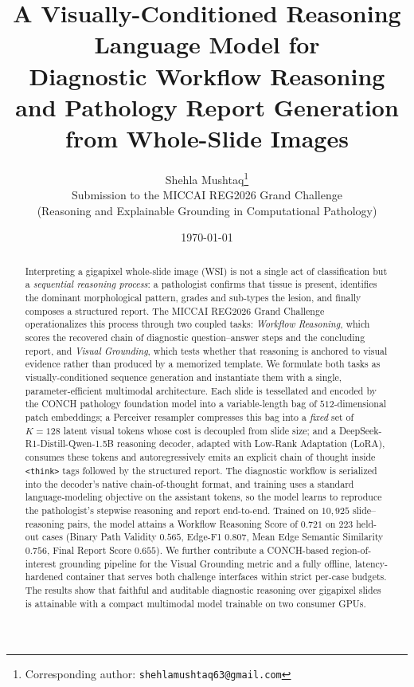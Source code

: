 \documentclass[11pt]{article}
\title{\textbf{A Visually-Conditioned Reasoning Language Model for\\
Diagnostic Workflow Reasoning and Pathology Report Generation\\
from Whole-Slide Images}}
\author{
Shehla Mushtaq\thanks{Corresponding author: \texttt{shehlamushtaq63@gmail.com}}\\
\small Submission to the MICCAI REG2026 Grand Challenge\\
\small (Reasoning and Explainable Grounding in Computational Pathology)
}
\date{\today}
\newcommand{\code}[1]{\texttt{\small #1}}
\begin{document}
\maketitle

\begin{abstract}
\noindent
Interpreting a gigapixel whole-slide image (WSI) is not a single act of
classification but a \emph{sequential reasoning process}: a pathologist confirms
that tissue is present, identifies the dominant morphological pattern, grades and
sub-types the lesion, and finally composes a structured report. The MICCAI
REG2026 Grand Challenge operationalizes this process through two coupled tasks:
\emph{Workflow Reasoning}, which scores the recovered chain of diagnostic
question--answer steps and the concluding report, and \emph{Visual Grounding},
which tests whether that reasoning is anchored to visual evidence rather than
produced by a memorized template. We formulate both tasks as visually-conditioned
sequence generation and instantiate them with a single, parameter-efficient
multimodal architecture. Each slide is tessellated and encoded by the CONCH
pathology foundation model into a variable-length bag of $512$-dimensional patch
embeddings; a Perceiver resampler compresses this bag into a \emph{fixed} set of
$K{=}128$ latent visual tokens whose cost is decoupled from slide size; and a
DeepSeek-R1-Distill-Qwen-1.5B reasoning decoder, adapted with Low-Rank Adaptation
(LoRA), consumes these tokens and autoregressively emits an explicit chain of
thought inside \code{<think>} tags followed by the structured report. The
diagnostic workflow is serialized into the decoder's native chain-of-thought
format, and training uses a standard language-modeling objective on the assistant
tokens, so the model learns to reproduce the pathologist's stepwise reasoning and
report end-to-end. Trained on $10{,}925$ slide--reasoning pairs, the model
attains a Workflow Reasoning Score of $\mathbf{0.721}$ on $223$ held-out cases
(Binary Path Validity $0.565$, Edge-F1 $0.807$, Mean Edge Semantic Similarity
$0.756$, Final Report Score $0.655$). We further contribute a CONCH-based
region-of-interest grounding pipeline for the Visual Grounding metric and a fully
offline, latency-hardened container that serves both challenge interfaces within
strict per-case budgets. The results show that faithful and auditable diagnostic
reasoning over gigapixel slides is attainable with a compact multimodal model
trainable on two consumer GPUs.
\end{abstract}
\end{document}
